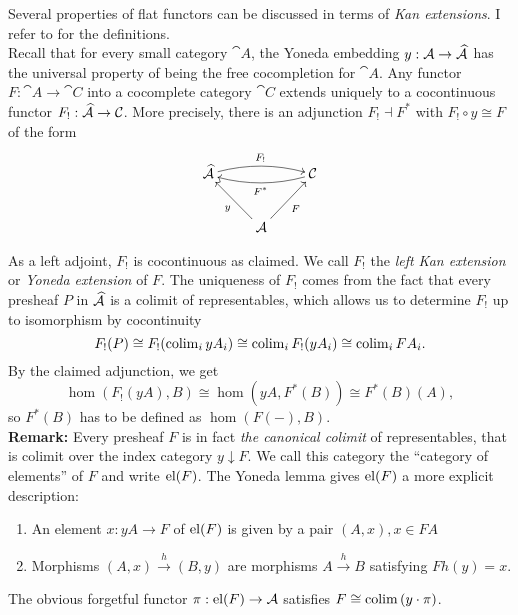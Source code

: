 Several properties of flat functors can be discussed in terms of \emph{Kan extensions}. I refer to \cite[\nopp~8.11,\nopp~9.16]{Awodey} for the definitions. \\

Recall that for every small category $\cat A$, the Yoneda embedding $y : \mathcal{A} \to \widehat{\mathcal{A}}$ has the universal property of being the free cocompletion for $\cat A$. Any functor $F : \cat A \to \cat C$ into a cocomplete category $\cat C$ extends uniquely to a cocontinuous functor $F_!: \widehat{\mathcal{A}} \to \mathcal{C}$. More precisely, there is an adjunction $F_! \dashv F^*$ with $F_! \circ y \cong F$ of the form
\[
\xymatrix{
\pre{\cat A} \ar@/^/[rr]^{F_!} & & \cat C \ar@/^/[ll]^{F^*} \\
& \cat A \ar[lu]^{y} \ar[ru]_{F}
}\]

As a left adjoint, $F_!$ is cocontinuous as claimed. We call $F_!$ the \emph{left Kan extension} or \emph{Yoneda extension} of $F$. The uniqueness of $F_!$ comes from the fact that every presheaf $P$ in $\widehat{\mathcal{A}}$ is a colimit of representables, which allows us to determine $F_!$ up to isomorphism by cocontinuity
\[ F_!(P) \cong F_!(\operatorname{colim}_i yA_i) \cong \operatorname{colim}_i F_!(yA_i) \cong \operatorname{colim}_i FA_i. \]
By the claimed adjunction, we get
\[ \hom(F_!(yA),B) \cong \hom(yA,F^*(B)) \cong F^*(B)(A), \]
so $F^*(B)$ has to be defined as $\hom(F(-),B)$. \\ 

\textbf{Remark:} Every presheaf $F$ is in fact \emph{the canonical colimit} of representables, that is colimit over the index category $y \downarrow F$. We call this category the ``category of elements'' of $F$ and write $\textrm{el}(F)$. The Yoneda lemma gives $\textrm{el}(F)$ a more explicit description:
\begin{enumerate}
\item An element $x : yA \to F$ of $\textrm{el}(F)$ is given by a pair $(A,x), x \in FA$
\item Morphisms $(A,x) \xrightarrow{h} (B,y)$ are morphisms $A \xrightarrow{h} B$ satisfying $Fh(y) = x$.
\end{enumerate}
The obvious forgetful functor $\pi : \textrm{el}(F) \to \mathcal{A}$ satisfies $F \cong \operatorname{colim}\, (y\cdot \pi)$. \\

